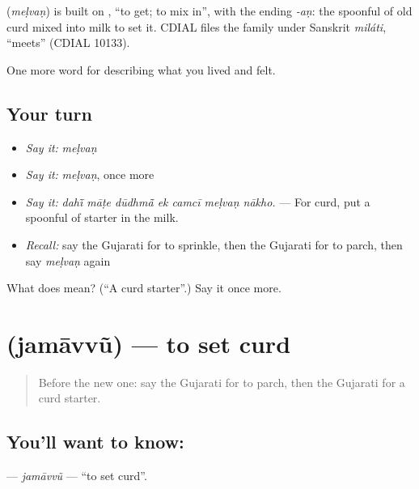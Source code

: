 \begin{cousinweb}
\textbf{} (\emph{meḷvaṇ}) is built on \textbf{}, \textquotedblleft{}to get; to mix in\textquotedblright{}, with the ending \emph{-aṇ}: the spoonful of old curd mixed into milk to set it. CDIAL files the family under Sanskrit \emph{miláti}, \textquotedblleft{}meets\textquotedblright{} (CDIAL 10133).
\end{cousinweb}

\begin{grammarlens}[title={What you've built}]
One more word for describing what you lived and felt.
\end{grammarlens}

\subsection*{Your turn}
\begin{itemize}
\raggedright
  \item \emph{Say it:} \emph{meḷvaṇ}
  \item \emph{Say it:} \emph{meḷvaṇ}, once more
  \item \emph{Say it:} \emph{dahī̃ māṭe dūdhmā̃ ek camcī meḷvaṇ nākho.} — For curd, put a spoonful of starter in the milk.
  \item \emph{Recall:} say the Gujarati for to sprinkle, then the Gujarati for to parch, then say \emph{meḷvaṇ} again
\end{itemize}

\begin{tcolorbox}[breakable,colback=teal!4,colframe=teal!35!black,title={Before you move on}]
What does  mean? (\textquotedblleft{}A curd starter\textquotedblright{}.) Say it once more.
\end{tcolorbox}
\section[\texorpdfstring{\gu{જમાવવું} (jamāvvũ)}{જમાવવું (jamāvvũ)}]{ (jamāvvũ) — to set curd}

\label{lesson:GU-C521-jamavvu}



\begin{quote}
Before the new one: say the Gujarati for to parch, then the Gujarati for a curd starter.
\end{quote}

\subsection*{You'll want to know: }
\textbf{} — \emph{jamāvvũ} — \textquotedblleft{}to set curd\textquotedblright{}.

